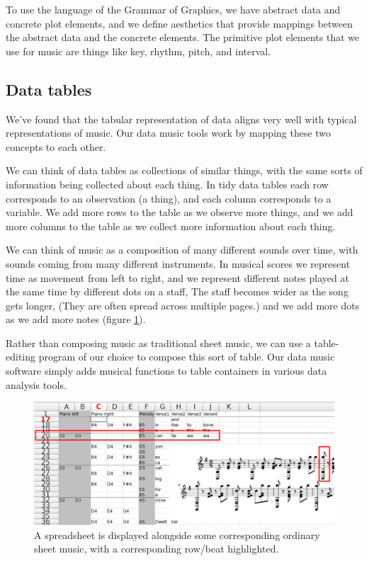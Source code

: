 \documentclass{acm_proc_article-sp}
\begin{document}
To use the language of the Grammar of Graphics, \cite{grammar}
we have abstract data and concrete plot elements,
and we define aesthetics that provide mappings
between the abstract data and the concrete elements.
The primitive plot elements that we use for music are things
like key, rhythm, pitch, and interval.

\subsection{Data tables}
We've found that the tabular representation of data aligns very well with
typical representations of music. Our data music tools work by mapping these
two concepts to each other.

We can think of data tables as collections of similar things, with the
same sorts of information being collected about each thing. In tidy data
tables \cite{tidydata} each row corresponds to an observation (a thing),
and each column corresponds to a variable. We add more rows to the table
as we observe more things, and we add more columns to the table as we
collect more information about each thing.

We can think of music as a composition of many different sounds over time,
with sounds coming from many different instruments. In musical scores
we represent time as movement from left to right, and we represent different
notes played at the same time by different dots on a staff,
The staff becomes wider as the song gets longer, (They are often spread
across multiple pages.) and we add more dots as we add more notes
(figure \ref{highlight}).

Rather than composing music as traditional sheet music,
we can use a table-editing program of our choice to compose
this sort of table. Our data music software simply adds
musical functions to table containers in various data analysis
tools.

\begin{figure} \label{highlight}
\centering
\includegraphics[width=\textwidth]{../sheetmusic/sheetmusic-side-by-side-highlighted-rowbeat.png}
\caption{A spreadsheet is displayed alongside some corresponding ordinary sheet music, with a corresponding row/beat highlighted.}
\end{figure}
\end{document}
